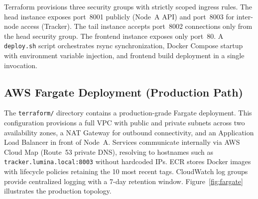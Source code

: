 \documentclass[conference]{IEEEtran}
\begin{document}
Terraform provisions three security groups with strictly scoped ingress rules.
The head instance exposes port~8001 publicly (Node~A API) and port~8003 for
inter-node access (Tracker). The tail instance accepts port~8002 connections
only from the head security group. The frontend instance exposes only port~80.
A \texttt{deploy.sh} script orchestrates rsync synchronization, Docker Compose
startup with environment variable injection, and frontend build deployment in a
single invocation.

\subsection{AWS Fargate Deployment (Production Path)}

The \texttt{terraform/} directory contains a production-grade Fargate
deployment. This configuration provisions a full VPC with public and private
subnets across two availability zones, a NAT Gateway for outbound connectivity,
and an Application Load Balancer in front of Node~A. Services communicate
internally via AWS Cloud Map (Route~53 private DNS), resolving to hostnames
such as \texttt{tracker.lumina.local:8003} without hardcoded IPs. ECR stores
Docker images with lifecycle policies retaining the 10 most recent tags.
CloudWatch log groups provide centralized logging with a 7-day retention window.
Figure~\ref{fig:fargate} illustrates the production topology.
\end{document}
